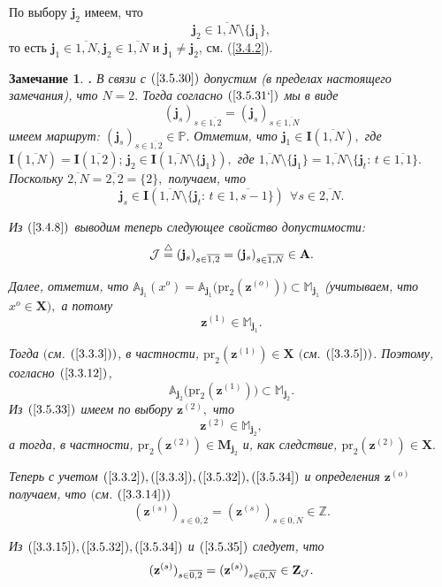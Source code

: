 \documentclass[11pt,twoside,openany]{report}
\newcommand{\bfn}{\begin{equation}}
\newcommand{\efn}{\end{equation}}
\newcommand{\df}{\stackrel{\triangle}{=}}
\newcommand{\ov}{\overline}
\newcounter{theo}
\newcounter{zam}
\newtheorem{zam}{Замечание}[section]
\newcommand{\TL}{\mbox{\bf{$\!\!$.}}}
\newcommand{\sm}{\setminus}
\newcommand{\fa}{\forall}
\newcommand{\cj}{{\cal J}}
\newcommand{\bba}{{\mathbb A}}
\newcommand{\bbz}{{\mathbb Z}}
\newcommand{\bbm}{{\mathbb M}}
\newcommand{\bbp}{{\mathbb P}}
\begin{document}
{По выбору $\mathbf{j}_2$
имеем, что
\bfn
  \label{3.5.31`}
  \mathbf{j}_2 \in \ov{1,N}\sm\{\mathbf{j}_1\}
  ,
\efn
то есть
$\mathbf{j}_1\in \ov{1,N}, \mathbf{j}_2\in \ov{1,N}$ и
$\mathbf{j}_1 \neq \mathbf{j}_2$,
см. (\ref{3.4.2}).

\begin{zam}
\label{z3.5.2}{\TL}
В связи с $(\ref{3.5.30})$
допустим
(в пределах настоящего замечания),
что $N = 2.$
Тогда согласно $(\ref{3.5.31`})$
мы в виде
$$
  (\mathbf{j}_s)_{s\in\ov{1,2}} = (\mathbf{j}_s)_{s\in\ov{1,N}}
$$
имеем маршрут:
$(\mathbf{j}_s)_{s\in\ov{1,2}} \in \bbp.$
Отметим, что
$\mathbf{j}_1\in \mathbf{I}(\ov{1,N}),$ где $\mathbf{I}(\ov{1,N}) = \mathbf{I}(\ov{1,2});\,
\mathbf{j}_2\in \mathbf{I}(\ov{1,N}\sm\{\mathbf{j}_1\}),$
где
$\ov{1,N} \sm\{\mathbf{j}_1\} =
\ov{1,N}\sm\{\mathbf{j}_t:\,t\in \ov{1,1}\}.$
Поскольку
$\ov{2,N} = \ov{2,2} = \{2\},$
получаем, что
$$
  \mathbf{j}_s \in \mathbf{I} \left(\ov{1,N}\sm\{\mathbf{j}_t:\,t\in \ov{1,s-1}\}\right)\ \ \fa
  s\in \ov{2,N}
  .
$$

Из $(\ref{3.4.8})$
выводим теперь следующее свойство допустимости:
\bfn
  \label{3.5.31}
  \cj \df (\mathbf{j}_s)_{s\in \ov{1,2}} = (\mathbf{j}_s)_{s\in \ov{1,N}}\in
  \mathbf{A}
  .
\efn

Далее, отметим, что
$\bba_{\mathbf{j}_1}(x^o) = \bba_{\mathbf{j}_1}\bigl(\mathrm{pr}_2(
\mathbf{z}^{(o)})\bigl) \subset \bbm_{\mathbf{j}_1}$
(учитываем, что $x^o\in \mathbf{X}),$ а потому
\bfn
  \label{3.5.32}
  \mathbf{z}^{(1)} \in \bbm_{\mathbf{j}_1}
  .
\efn

Тогда $($см. $(\ref{3.3.3}))$,
в частности,
$\mathrm{pr}_2(\mathbf{z}^{(1)})\in \mathbf{X}$
$($см. $(\ref{3.3.5}))$.
Поэтому, согласно $(\ref{3.3.12})$,
\bfn
  \label{3.5.33}
  \bba_{\mathbf{j}_2}\bigl(\mathrm{pr}_2(\mathbf{z}^{(1)})\bigl)\subset
  \bbm_{\mathbf{j}_2}
  .
\efn
Из $(\ref{3.5.33})$
имеем по выбору
$\mathbf{z}^{(2)},$ что
\bfn
  \label{3.5.34}
  \mathbf{z}^{(2)} \in \bbm_{\mathbf{j}_2}
  ,
\efn
а тогда, в частности,
$\mathrm{pr}_2(\mathbf{z}^{(2)})\in \mathbf{M}_{\mathbf{j}_2}$
и, как следствие,
$\mathrm{pr}_2(\mathbf{z}^{(2)})\in \mathbf{X}.$

Теперь с учетом $(\ref{3.3.2}), (\ref{3.3.3}), (\ref{3.5.32}), (\ref{3.5.34})$ и
определения $\mathbf{z}^{(o)}$ получаем, что $($см. $(\ref{3.3.14}))$
\bfn
  \label{3.5.35}
  (\mathbf{z}^{(s)})_{s\in\ov{0,2}} =
  (\mathbf{z}^{(s)})_{s\in\ov{0,N}}\in \bbz
  .
\efn

Из $(\ref{3.3.15}), (\ref{3.5.32}), (\ref{3.5.34})$ и $(\ref{3.5.35})$ следует, что
\bfn
  \label{3.5.36}
  (\mathbf{z}^{(s)})_{s\in\ov{0,2}} = (\mathbf{z}^{(s)})_{s\in\ov{0,N}}
 \in \mathbf{Z}_\cj
 .
\efn


\end{zam}}
\end{document}
